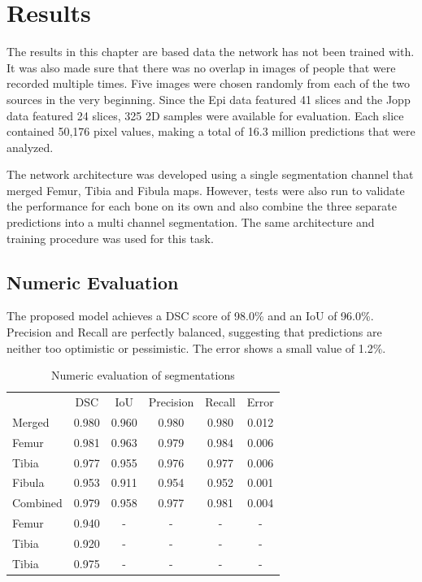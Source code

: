 \section{Results}

The results in this chapter are based data the network has not been trained with. It was also made sure that there was no overlap in images of people that were recorded multiple times. Five images were chosen randomly from each of the two sources in the very beginning. Since the Epi data featured 41 slices and the Jopp data featured 24 slices, 325 2D samples were available for evaluation. Each slice contained 50,176 pixel values, making a total of 16.3 million predictions that were analyzed.

The network architecture was developed using a single segmentation channel that merged Femur, Tibia and Fibula maps. However, tests were also run to validate the performance for each bone on its own and also combine the three separate predictions into a multi channel segmentation. The same architecture and training procedure was used for this task.

\subsection{Numeric Evaluation}

The proposed model achieves a DSC score of 98.0\% and an IoU of 96.0\%. Precision and Recall are perfectly balanced, suggesting that predictions are neither too optimistic or pessimistic. The error shows a small value of 1.2\%.

\begin{table}[H]
    \centering
    \begin{tabular}{| l | c | c | c | c | c |}
    \hline
           & DSC & IoU & Precision & Recall & Error \\ 
    \Xhline{3\arrayrulewidth}
    Merged & 0.980 & 0.960 & 0.980 & 0.980 & 0.012 \\
    \hline
    Femur & 0.981 & 0.963 & 0.979 & 0.984 & 0.006 \\
    \hline
    Tibia & 0.977 & 0.955 & 0.976 & 0.977 & 0.006 \\
    \hline
    Fibula & 0.953 & 0.911 & 0.954 & 0.952 & 0.001 \\
    \hline
    Combined & 0.979 & 0.958 & 0.977 & 0.981 & 0.004 \\
    \Xhline{3\arrayrulewidth}
    Femur \cite{Dodin2011} & 0.940 & - & - & - & - \\
    \hline
    Tibia \cite{Dodin2011} & 0.920 & - & - & - & - \\
    \hline
    Tibia \cite{Dam} & 0.975 & - & - & - & - \\
    \hline
    \end{tabular}
    \caption{Numeric evaluation of segmentations}
\end{table}

